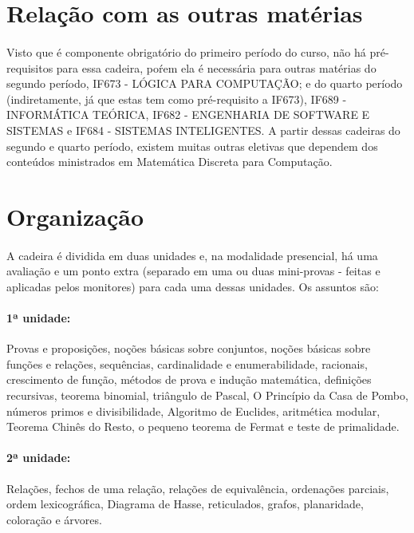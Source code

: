 \documentclass{article}
\begin{document}
\section{Relação com as outras matérias}
	\paragraph{}Visto que é componente obrigatório do primeiro período do curso, não há pré-requisitos para essa cadeira, poŕem ela é necessária para outras matérias do segundo período, IF673 - LÓGICA PARA COMPUTAÇÃO; e do quarto período (indiretamente, já que estas tem como pré-requisito a IF673), IF689 - INFORMÁTICA TEÓRICA, IF682 - ENGENHARIA DE SOFTWARE E SISTEMAS e IF684 - SISTEMAS INTELIGENTES. A partir dessas cadeiras do segundo e quarto período, existem muitas outras eletivas que dependem dos conteúdos ministrados em Matemática Discreta para Computação. \cite{site1}

\section{Organização}
	\paragraph{}A cadeira é dividida em duas unidades e, na modalidade presencial, há uma avaliação e um ponto extra (separado em uma ou duas mini-provas - feitas e aplicadas pelos monitores) para cada uma dessas unidades. Os assuntos são:
	\paragraph{1ª unidade:}Provas e proposições, noções básicas sobre conjuntos, noções básicas sobre funções e relações, sequências, cardinalidade e enumerabilidade, racionais, crescimento de função, métodos de prova e indução matemática, definições recursivas, teorema binomial, triângulo de Pascal, O Princípio da Casa de Pombo, números primos e divisibilidade, Algoritmo de Euclides, aritmética modular, Teorema Chinês do Resto, o pequeno teorema de Fermat e teste de primalidade.

	\paragraph{2ª unidade:}Relações, fechos de uma relação, relações de equivalência, ordenações parciais, ordem lexicográfica, Diagrama de Hasse, reticulados, grafos, planaridade, coloração e árvores.




\end{document}
